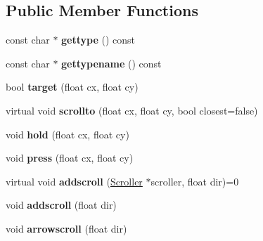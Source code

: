 \subsection*{Public Member Functions}
\begin{DoxyCompactItemize}
\item 
\mbox{\label{struct_u_i_1_1_scroll_bar_a3237a117ac2a933c5666e12e82ccc279}} 
const char $\ast$ {\bfseries gettype} () const
\item 
\mbox{\label{struct_u_i_1_1_scroll_bar_adf8b30592d03615141b6f9f8b55951ec}} 
const char $\ast$ {\bfseries gettypename} () const
\item 
\mbox{\label{struct_u_i_1_1_scroll_bar_a6c2c6f7ce9a72c4bdf1bc935993b9aa4}} 
bool {\bfseries target} (float cx, float cy)
\item 
\mbox{\label{struct_u_i_1_1_scroll_bar_a541716a8ea30ece26ec852dfa70383a7}} 
virtual void {\bfseries scrollto} (float cx, float cy, bool closest=false)
\item 
\mbox{\label{struct_u_i_1_1_scroll_bar_aa63afa17d210a89b16ebdb034aae0af3}} 
void {\bfseries hold} (float cx, float cy)
\item 
\mbox{\label{struct_u_i_1_1_scroll_bar_ae64fa02dc4c739001d0a9449bb9765cf}} 
void {\bfseries press} (float cx, float cy)
\item 
\mbox{\label{struct_u_i_1_1_scroll_bar_ac8a993f7a3d9ad221c8fa3f20cf8ad93}} 
virtual void {\bfseries addscroll} (\hyperlink{struct_u_i_1_1_scroller}{Scroller} $\ast$scroller, float dir)=0
\item 
\mbox{\label{struct_u_i_1_1_scroll_bar_a31e02226bfbfb4e0b9dd5922991f2418}} 
void {\bfseries addscroll} (float dir)
\item 
\mbox{\label{struct_u_i_1_1_scroll_bar_a0444005249790e9854b15d5181ffa8f7}} 
void {\bfseries arrowscroll} (float dir)
\item 
\mbox{\label{struct_u_i_1_1_scroll_bar_ab616828b3587704076b9cc6542d5eccc}} 

\end{DoxyCompactItemize}
